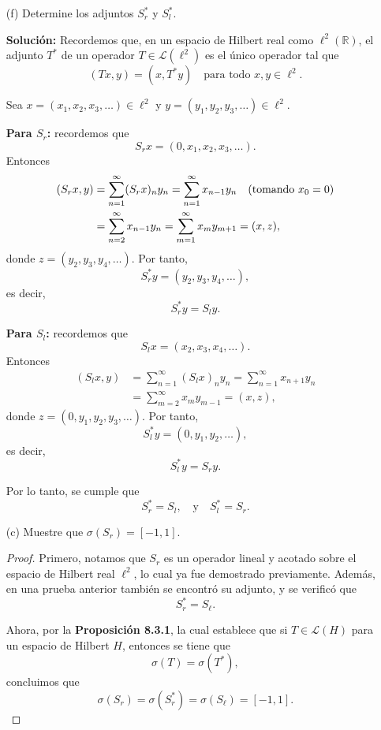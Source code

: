 \begin{enumerate}
\begin{proof}
Así, ni \( \lambda = 1 \) ni \( \lambda = -1 \) son valores propios de \( S_l \).

En conclusión,
\[
EV(S_l) = (-1,1).
\]
\end{proof}

   
    \item[(f)] Determine los adjuntos \( S_{r}^* \) y \( S_{l}^* \).
    
    \textbf{Solución:}
    Recordemos que, en un espacio de Hilbert real como \( \ell^2(\mathbb{R}) \), el adjunto \( T^* \) de un operador \( T \in \mathcal{L}(\ell^2) \) es el único operador tal que
\[
(Tx, y) = (x, T^*y) \quad \text{para todo } x, y \in \ell^2.
\]

Sea \( x = (x_1, x_2, x_3, \ldots) \in \ell^2 \) y \( y = (y_1, y_2, y_3, \ldots) \in \ell^2 \). 

\textbf{Para \( S_r \):} recordemos que
\[
S_r x = (0, x_1, x_2, x_3, \ldots).
\]
Entonces
\begin{align*}
(S_r x, y) &= \sum_{n=1}^\infty (S_r x)_n y_n = \sum_{n=1}^\infty x_{n-1} y_n \quad \text{(tomando \( x_0 = 0 \))} \\
&= \sum_{n=2}^\infty x_{n-1} y_n = \sum_{m=1}^\infty x_m y_{m+1} = (x, z),
\end{align*}
donde \( z = (y_2, y_3, y_4, \ldots) \). Por tanto,
\[
S_r^* y = (y_2, y_3, y_4, \ldots),
\]
es decir,
\[
S_r^* y = S_l y.
\]

\textbf{Para \( S_l \):} recordemos que
\[
S_l x = (x_2, x_3, x_4, \ldots).
\]
Entonces
\begin{align*}
(S_l x, y) &= \sum_{n=1}^\infty (S_l x)_n y_n = \sum_{n=1}^\infty x_{n+1} y_n \\
&= \sum_{m=2}^\infty x_m y_{m-1} = (x, z),
\end{align*}
donde \( z = (0, y_1, y_2, y_3, \ldots) \). Por tanto,
\[
S_l^* y = (0, y_1, y_2, \ldots),
\]
es decir,
\[
S_l^* y = S_r y.
\]

Por lo tanto, se cumple que
\[
S_r^* = S_l, \quad \text{y} \quad S_l^* = S_r.
\]
\item[(c)] Muestre que \( \sigma(S_{r}) = [-1, 1] \).
    \begin{proof}
        Primero, notamos que $S_r$ es un operador lineal y acotado sobre el espacio de Hilbert real $\ell^2$, lo cual ya fue demostrado previamente. Además, en una prueba anterior también se encontró su adjunto, y se verificó que
\[
S_r^* = S_\ell.
\]

Ahora, por la \textbf{Proposición 8.3.1}, la cual establece que si $T \in \mathcal{L}(H)$ para un espacio de Hilbert $H$, entonces se tiene que
\[
\sigma(T) = \sigma(T^*),
\]
concluimos que
\[
\sigma(S_r) = \sigma(S_r^*) = \sigma(S_\ell)=[-1,1].
\]


\end{proof}
\end{enumerate}
